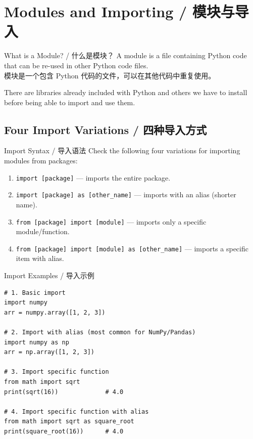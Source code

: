 \documentclass[11pt,a4paper]{report}
\let\oldtexttt\texttt
\renewcommand{\texttt}[1]{\textcolor{mainblue}{\oldtexttt{#1}}}
\begin{document}
\section{Modules and Importing / 模块与导入}

\begin{concept}{What is a Module? / 什么是模块？}
    A module is a file containing Python code that can be re-used in other Python code files. \\
    模块是一个包含 Python 代码的文件，可以在其他代码中重复使用。

    There are libraries already included with Python and others we have to install before being able to import and use them.
\end{concept}

\subsection{Four Import Variations / 四种导入方式}

\begin{concept}{Import Syntax / 导入语法}
    Check the following four variations for importing modules from packages:
    \begin{enumerate}[itemsep=0.5em]
        \item \texttt{import [package]} — imports the entire package.
        \item \texttt{import [package] as [other\_name]} — imports with an alias (shorter name).
        \item \texttt{from [package] import [module]} — imports only a specific module/function.
        \item \texttt{from [package] import [module] as [other\_name]} — imports a specific item with alias.
    \end{enumerate}
\end{concept}

\begin{examplebox}{Import Examples / 导入示例}
\begin{lstlisting}
# 1. Basic import
import numpy
arr = numpy.array([1, 2, 3])

# 2. Import with alias (most common for NumPy/Pandas)
import numpy as np
arr = np.array([1, 2, 3])

# 3. Import specific function
from math import sqrt
print(sqrt(16))             # 4.0

# 4. Import specific function with alias
from math import sqrt as square_root
print(square_root(16))      # 4.0
\end{lstlisting}
\end{examplebox}
\end{document}
